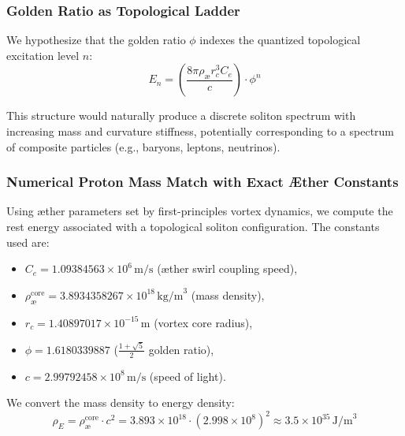             \subsubsection{Golden Ratio as Topological Ladder}

            We hypothesize that the golden ratio $\phi$ indexes the quantized topological excitation level $n$:
            \begin{equation}
            E_n = \left( \frac{8\pi \rho_{\text{æ}} r_c^3 C_e}{c} \right) \cdot \phi^n
            \end{equation}

            This structure would naturally produce a discrete soliton spectrum with increasing mass and curvature stiffness, potentially corresponding to a spectrum of composite particles (e.g., baryons, leptons, neutrinos).

            \subsubsection{Numerical Proton Mass Match with Exact Æther Constants}

            Using æther parameters set by first-principles vortex dynamics, we compute the rest energy associated with a topological soliton configuration. The constants used are:

            \begin{itemize}
              \item $C_e = 1.09384563 \times 10^6 \, \text{m/s}$ (æther swirl coupling speed),
              \item $\rho_{\text{æ}}^{\text{core}} = 3.8934358267 \times 10^{18} \, \text{kg/m}^3$ (mass density),
              \item $r_c = 1.40897017 \times 10^{-15} \, \text{m}$ (vortex core radius),
              \item $\phi = 1.6180339887$  ($\frac{1 + \sqrt{5}}{2}$ golden ratio),
              \item $c = 2.99792458 \times 10^8 \, \text{m/s}$ (speed of light).
            \end{itemize}

            We convert the mass density to energy density:
            \begin{equation}
            \rho_E = \rho_{\text{æ}}^{\text{core}} \cdot c^2 = 3.893 \times 10^{18} \cdot (2.998 \times 10^8)^2 \approx 3.5 \times 10^{35} \, \text{J/m}^3
            \end{equation}

